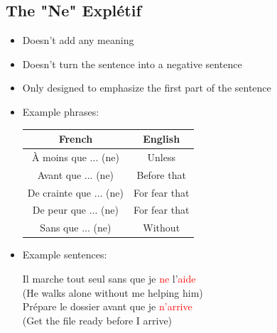 \documentclass{book}
\begin{document}
    \subsection{The "Ne" Explétif}
        \begin{itemize}
            \item Doesn't add any meaning
            \item Doesn't turn the sentence into a negative sentence
            \item Only designed to emphasize the first part of the sentence
            \item Example phrases:
                \begin{center}
                    \begin{tabular}{|c|c|}
                        \hline
                        \textbf{French} & \textbf{English} \\
                        \hline
                        À moins que ... (ne) & Unless \\
                        \hline
                        Avant que ... (ne) & Before that \\
                        \hline
                        De crainte que ... (ne) & For fear that \\
                        \hline
                        De peur que ... (ne) & For fear that \\
                        \hline
                        Sans que ... (ne) & Without \\
                        \hline
                    \end{tabular}
                \end{center}
            \item Example sentences:
                \begin{center}
                    Il marche tout seul sans que je \textcolor{red}{ne} l'\textcolor{red}{aide} \\
                    (He walks alone without me helping him) \\
                    Prépare le dossier avant que je \textcolor{red}{n'arrive} \\
                    (Get the file ready before I arrive)
                \end{center}
        \end{itemize}
\end{document}
